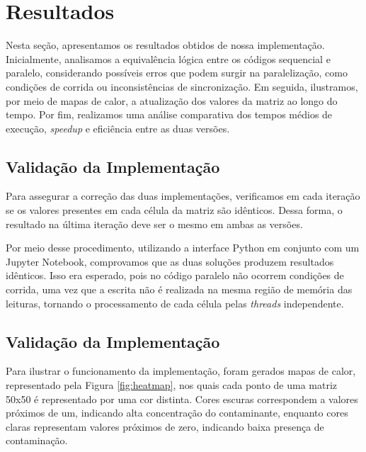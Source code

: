 \documentclass[12pt]{article}
\begin{document}
\section{Resultados}

Nesta seção, apresentamos os resultados obtidos de nossa implementação.
Inicialmente, analisamos a equivalência lógica entre os códigos sequencial e
paralelo, considerando possíveis erros que podem surgir na paralelização, como
condições de corrida ou inconsistências de sincronização. Em seguida,
ilustramos, por meio de mapas de calor, a atualização dos valores da matriz ao
longo do tempo. Por fim, realizamos uma análise comparativa dos tempos médios
de execução, \textit{speedup} e eficiência entre as duas versões.

\subsection{Validação da Implementação}

Para assegurar a correção das duas implementações, verificamos em cada iteração
se os valores presentes em cada célula da matriz são idênticos. Dessa forma, o
resultado na última iteração deve ser o mesmo em ambas as versões.

Por meio desse procedimento, utilizando a interface Python em conjunto com um
Jupyter Notebook, comprovamos que as duas soluções produzem resultados
idênticos. Isso era esperado, pois no código paralelo não ocorrem condições de
corrida, uma vez que a escrita não é realizada na mesma região de memória das
leituras, tornando o processamento de cada célula pelas \textit{threads}
independente.

\subsection{Validação da Implementação}

Para ilustrar o funcionamento da implementação, foram gerados mapas de calor,
representado pela Figura \ref{fig:heatmap}, nos quais cada ponto de uma matriz
50x50 é representado por uma cor distinta. Cores escuras correspondem a valores
próximos de um, indicando alta concentração do contaminante, enquanto cores
claras representam valores próximos de zero, indicando baixa presença de
contaminação.
\end{document}
